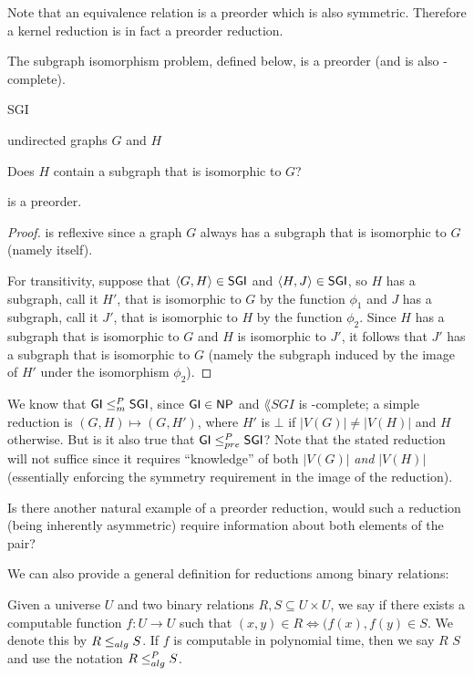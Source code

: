 Note that an equivalence relation is a preorder which is also symmetric.
Therefore a kernel reduction is in fact a preorder reduction.

The subgraph isomorphism problem, defined below, is a preorder (and is also \NP-complete\cite{gj79}).
\begin{langdef}{SGI}
\begin{instance}
  undirected graphs $G$ and $H$
\end{instance}
\begin{question}
  Does $H$ contain a subgraph that is isomorphic to $G$?
\end{question}
\end{langdef}

\begin{proposition}
   is a preorder.
\end{proposition}
\begin{proof}
   is reflexive since a graph $G$ always has a subgraph that is isomorphic to $G$ (namely itself).

  For transitivity, suppose that $\langle G,H\rangle\in{\ensuremath{\mathsf{SGI}}}$ and $\langle H,J\rangle\in{\ensuremath{\mathsf{SGI}}}$, so $H$ has a subgraph, call it $H'$, that is isomorphic to $G$ by the function $\phi_1$ and $J$ has a subgraph, call it $J'$, that is isomorphic to $H$ by the function $\phi_2$.
  Since $H$ has a subgraph that is isomorphic to $G$ and $H$ is isomorphic to $J'$, it follows that $J'$ has a subgraph that is isomorphic to $G$ (namely the subgraph induced by the image of $H'$ under the isomorphism $\phi_2$).
\end{proof}

We know that ${\mathsf{GI}}\leq^{P}_{m}{\mathsf{SGI}}$, since ${\mathsf{GI}}\in{\ensuremath{\mathsf{NP}}}$ and $\lang{SGI}$ is \NP-complete; a simple reduction is $(G, H)\mapsto(G, H')$, where $H'$ is $\bot$ if $|V(G)|\neq|V(H)|$ and $H$ otherwise.
But is it also true that ${\mathsf{GI}}\leq^{P}_{pre}{\mathsf{SGI}}$?
Note that the stated reduction will not suffice since it requires ``knowledge'' of both $|V(G)|$ \emph{and} $|V(H)|$ (essentially enforcing the symmetry requirement in the image of the reduction).

Is there another natural example of a preorder reduction, would such a reduction (being inherently asymmetric) require information about both elements of the pair?

We can also provide a general definition for reductions among binary relations:
\begin{definition}
  Given a universe $U$ and two binary relations $R,S\subseteq U\times U$, we say  if there exists a computable function $f\colon U\to U$ such that $(x,y)\in R \iff (f(x), f(y)\in S$.
  We denote this by $R\leq_{alg} S$.
  If $f$ is computable in polynomial time, then we say $R$  $S$ and use the notation $R\leq^{P}_{alg} S$.
\end{definition}
